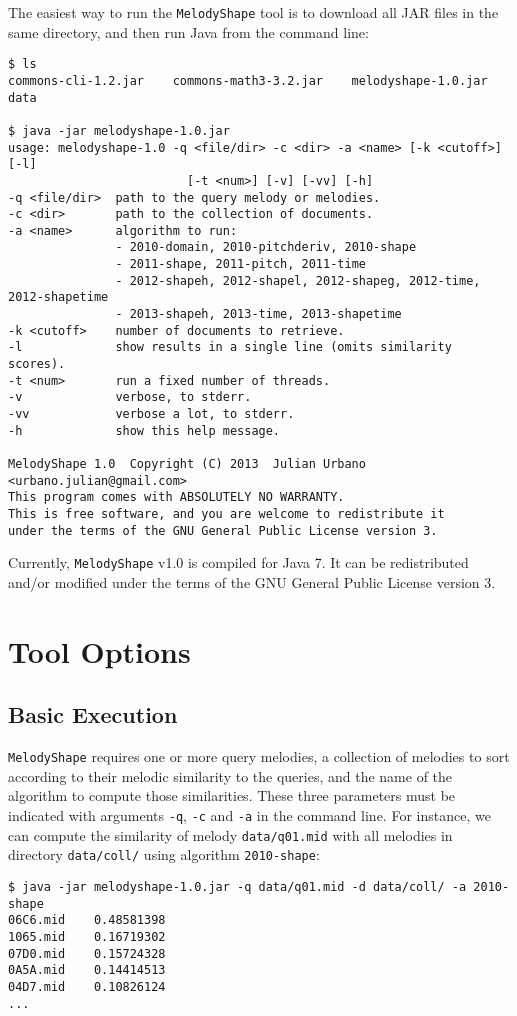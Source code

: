 \documentclass[twoside]{article}
\begin{document}
The easiest way to run the \texttt{MelodyShape} tool is to download all JAR files in the same directory, and then run Java from the command line:
\begin{lstlisting}
$ ls
commons-cli-1.2.jar    commons-math3-3.2.jar    melodyshape-1.0.jar    data

$ java -jar melodyshape-1.0.jar
usage: melodyshape-1.0 -q <file/dir> -c <dir> -a <name> [-k <cutoff>] [-l]
                         [-t <num>] [-v] [-vv] [-h]
-q <file/dir>  path to the query melody or melodies.
-c <dir>       path to the collection of documents.
-a <name>      algorithm to run:
               - 2010-domain, 2010-pitchderiv, 2010-shape
               - 2011-shape, 2011-pitch, 2011-time
               - 2012-shapeh, 2012-shapel, 2012-shapeg, 2012-time, 2012-shapetime
               - 2013-shapeh, 2013-time, 2013-shapetime
-k <cutoff>    number of documents to retrieve.
-l             show results in a single line (omits similarity scores).
-t <num>       run a fixed number of threads.
-v             verbose, to stderr.
-vv            verbose a lot, to stderr.
-h             show this help message.

MelodyShape 1.0  Copyright (C) 2013  Julian Urbano <urbano.julian@gmail.com>
This program comes with ABSOLUTELY NO WARRANTY.
This is free software, and you are welcome to redistribute it
under the terms of the GNU General Public License version 3.
\end{lstlisting}

Currently, \texttt{MelodyShape} v1.0 is compiled for Java 7. It can be redistributed and/or modified under the terms of the GNU General Public License version 3.

\section{Tool Options}

\subsection{Basic Execution}

\texttt{MelodyShape} requires one or more query melodies, a collection of melodies to sort according to their melodic similarity to the queries, and the name of the algorithm to compute those similarities. These three parameters must be indicated with arguments \texttt{-q}, \texttt{-c} and \texttt{-a} in the command line. For instance, we can compute the similarity of melody \texttt{data/q01.mid} with all melodies in directory \texttt{data/coll/} using algorithm \texttt{2010-shape}:
\begin{lstlisting}
$ java -jar melodyshape-1.0.jar -q data/q01.mid -d data/coll/ -a 2010-shape
06C6.mid    0.48581398
1065.mid    0.16719302
07D0.mid    0.15724328
0A5A.mid    0.14414513
04D7.mid    0.10826124
...
\end{lstlisting}
\end{document}

